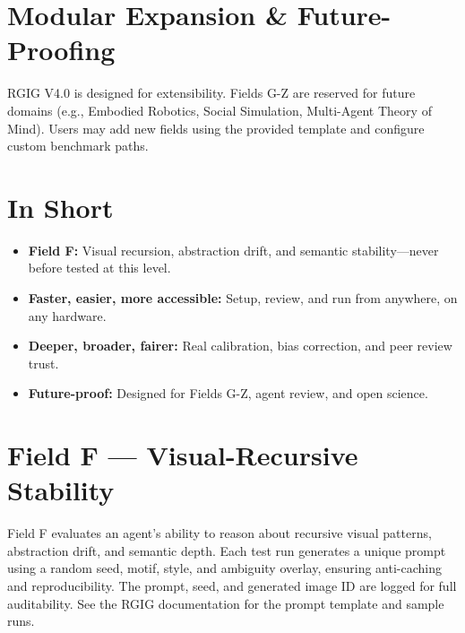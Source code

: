 \documentclass[11pt]{article}
\begin{document}
\section*{Modular Expansion \& Future-Proofing}
RGIG V4.0 is designed for extensibility. Fields G-Z are reserved for future domains (e.g., Embodied Robotics, Social Simulation, Multi-Agent Theory of Mind). Users may add new fields using the provided template and configure custom benchmark paths.

\section*{In Short}
\begin{itemize}
  \item \textbf{Field F:} Visual recursion, abstraction drift, and semantic stability—never before tested at this level.
  \item \textbf{Faster, easier, more accessible:} Setup, review, and run from anywhere, on any hardware.
  \item \textbf{Deeper, broader, fairer:} Real calibration, bias correction, and peer review trust.
  \item \textbf{Future-proof:} Designed for Fields G-Z, agent review, and open science.
\end{itemize}

\section*{Field F — Visual-Recursive Stability}
Field F evaluates an agent's ability to reason about recursive visual patterns, abstraction drift, and semantic depth. Each test run generates a unique prompt using a random seed, motif, style, and ambiguity overlay, ensuring anti-caching and reproducibility. The prompt, seed, and generated image ID are logged for full auditability. See the RGIG documentation for the prompt template and sample runs.
\end{document}

